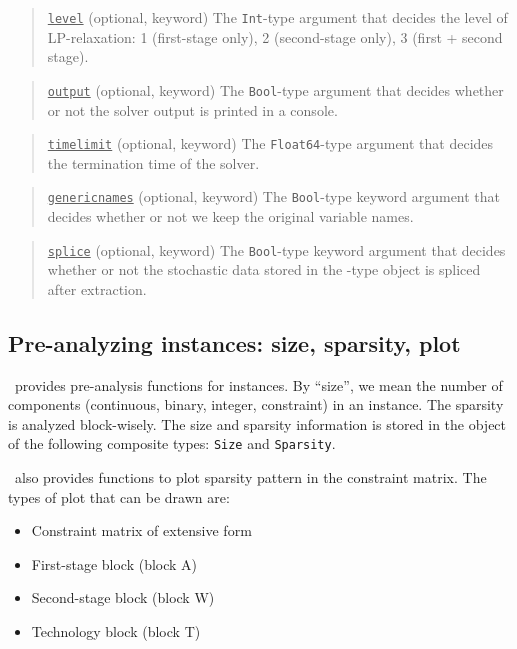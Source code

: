 \begin{quote}
	\noindent\underline{\texttt{level}} (optional, keyword) The \texttt{Int}-type argument that decides the level of LP-relaxation: 1 (first-stage only), 2 (second-stage only), 3 (first + second stage).  
\end{quote}

\begin{quote}
	\noindent\underline{\texttt{output}} (optional, keyword) The \texttt{Bool}-type argument that decides whether or not the solver output is printed in a console.
\end{quote}

\begin{quote}
	\noindent\underline{\texttt{timelimit}} (optional, keyword) The \texttt{Float64}-type argument that decides the termination time of the solver.
\end{quote}

\begin{quote}
	\noindent\underline{\texttt{genericnames}} (optional, keyword) The \texttt{Bool}-type keyword argument that decides whether or not we keep the original variable names. 
\end{quote}

\begin{quote}
	\noindent\underline{\texttt{splice}} (optional, keyword) The \texttt{Bool}-type keyword argument that decides whether or not the stochastic data stored in the \jumpmodel-type object is spliced after extraction.
\end{quote}


\subsection{Pre-analyzing instances: size, sparsity, plot} \label{tutorial:analyze_instance}
\siplibjl\ provides pre-analysis functions for instances. By ``size'', we mean the number of components (continuous, binary, integer, constraint) in an instance. The sparsity is analyzed block-wisely. The size and sparsity information is stored in the object of the following composite types: \texttt{Size} and \texttt{Sparsity}.

\siplibjl\ also provides functions to plot sparsity pattern in the constraint matrix. The types of plot that can be drawn are:
\begin{itemize}
	\item Constraint matrix of extensive form
	\item First-stage block (block A)
	\item Second-stage block (block W)
	\item Technology block (block T)
\end{itemize}

